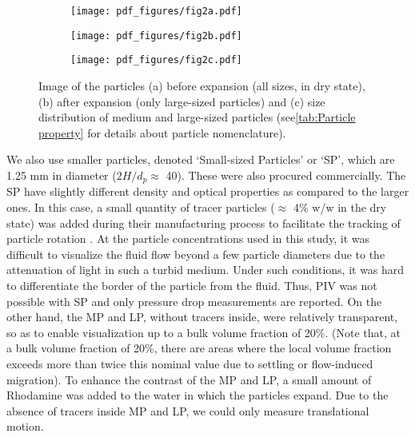 \documentclass{jfm}
\begin{document}
\begin{figure}
\centering
\begin{subfigure}{.30\textwidth}
  \centering
  \texttt{[image: pdf\_figures/fig2a.pdf]}
  \caption{}
  \label{fig:Particles before expansion}
\end{subfigure}%
\begin{subfigure}{.30\textwidth}
  \centering
  \texttt{[image: pdf\_figures/fig2b.pdf]}
  \caption{}
  \label{fig:Particles after expansion}
\end{subfigure}
\begin{subfigure}{.30\textwidth}
  \centering
  \texttt{[image: pdf\_figures/fig2c.pdf]}
  \caption{}
  \label{fig:Particles size}
\end{subfigure}
\caption{Image of the particles (a) before expansion (all sizes, in dry state), (b) after expansion (only large-sized particles) and (c) size distribution of medium and large-sized particles (see\ref{tab:Particle property} for details about particle nomenclature).}
\label{fig:Particles before and after expansion}
\end{figure}

We also use smaller particles, denoted `Small-sized Particles' or `SP', which are 1.25 mm in diameter ($2H/d_{p}\approx$ 40). These were also procured commercially. 
The SP have slightly different density and optical properties as compared to the larger ones. 
In this case, a small quantity of tracer particles ($\approx$ 4\% w/w in the dry state) was added during their manufacturing process to facilitate the tracking of particle rotation \cite[see][]{bellani2012shape}. At the particle concentrations used in this study, it was difficult to visualize the fluid flow beyond a few particle diameters due to the attenuation of light in such a turbid medium. Under such conditions, it was hard to differentiate the border of the particle from the fluid. Thus, PIV was not possible with SP and only pressure drop measurements are reported. 
On the other hand, the MP and LP, without tracers inside, were relatively transparent, so as to enable visualization up to a bulk volume fraction of 20\%. (Note that, at a bulk volume fraction of 20\%, there are areas where the local volume fraction exceeds more than twice this nominal  value due to settling or flow-induced migration).  
To enhance the contrast of the MP and LP, a small amount of Rhodamine was added to the water in which the particles expand. Due to the absence of tracers inside MP and LP, we could only measure translational motion.
\end{document}
